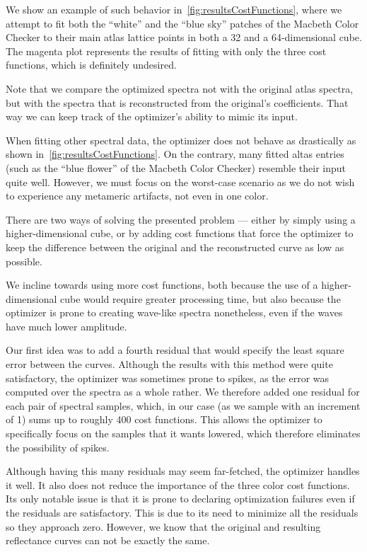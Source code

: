 We show an example of such behavior in~\cref{fig:resultsCostFunctions}, where we attempt to fit both the ``white'' and the ``blue sky'' patches of the Macbeth Color Checker to their main atlas lattice points in both a 32 and a 64-dimensional cube. The magenta plot represents the results of fitting with only the three cost functions, which is definitely undesired.

Note that we compare the optimized spectra not with the original atlas spectra, but with the spectra that is reconstructed from the original's coefficients. That way we can keep track of the optimizer's ability to mimic its input.

When fitting other spectral data, the optimizer does not behave as drastically as shown in~\cref{fig:resultsCostFunctions}. On the contrary, many fitted altas entries (such as the ``blue flower'' of the Macbeth Color Checker) resemble their input quite well. However, we must focus on the worst-case scenario as we do not wish to experience any metameric artifacts, not even in one color.

There are two ways of solving the presented problem --- either by simply using a higher-dimensional cube, or by adding cost functions that force the optimizer to keep the difference between the original and the reconstructed curve as low as possible.

We incline towards using more cost functions, both because the use of a higher-dimensional cube would require greater processing time, but also because the optimizer is prone to creating wave-like spectra nonetheless, even if the waves have much lower amplitude.

Our first idea was to add a fourth residual that would specify the least square error between the curves. Although the results with this method were quite satisfactory, the optimizer was sometimes prone to spikes, as the error was computed over the spectra as a whole rather. We therefore added one residual for each pair of spectral samples, which, in our case (as we sample with an increment of 1) sums up to roughly 400 cost functions. This allows the optimizer to specifically focus on the samples that it wants lowered, which therefore eliminates the possibility of spikes.

Although having this many residuals may seem far-fetched, the optimizer handles it well. It also does not reduce the importance of the three color cost functions. Its only notable issue is that it is prone to declaring optimization failures even if the residuals are satisfactory. This is due to its need to minimize all the residuals so they approach zero. However, we know that the original and resulting reflectance curves can not be exactly the same.

